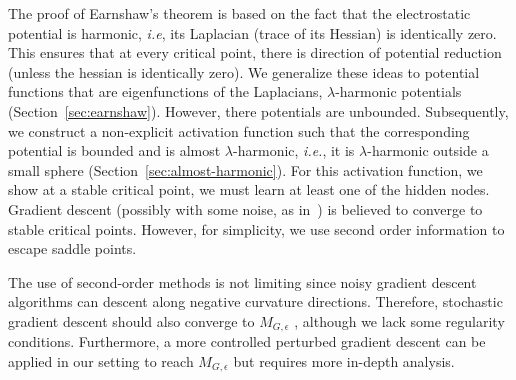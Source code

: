 
The proof of Earnshaw's theorem is based on the fact that the electrostatic potential is harmonic, \emph{i.e}, its Laplacian (trace of its Hessian) is identically zero. This ensures that at every critical point, there is direction of potential reduction (unless the hessian is identically zero). We generalize these ideas to potential functions that are eigenfunctions of the Laplacians, $\lambda$-harmonic potentials (Section~\ref{sec:earnshaw}). However, there potentials are unbounded. Subsequently, we construct a non-explicit activation function such that the corresponding potential is bounded and is almost $\lambda$-harmonic, \emph{i.e.}, it is $\lambda$-harmonic outside a small sphere (Section~\ref{sec:almost-harmonic}). For this activation function, we show at a stable critical point, we must learn at least one of the hidden nodes. Gradient descent (possibly with some noise, as in~\cite{GeHJY15}) is believed to converge to stable critical points. However, for simplicity, we use second order information to escape saddle points.


{\color{red}The use of second-order methods is not limiting since noisy gradient descent algorithms can descent along negative curvature directions. Therefore, stochastic gradient descent should also converge to $M_{G,\epsilon}$ \cite{GeHJY15}, although we lack some regularity conditions. Furthermore, a more controlled perturbed gradient descent \cite{jin2017escape} can be applied in our setting to reach $M_{G,\epsilon}$ but requires more in-depth analysis.}


